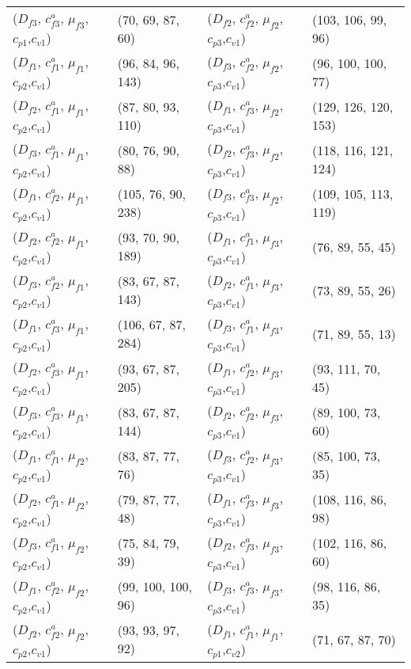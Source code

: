 \documentclass[preprint,12pt]{elsarticle}
\begin{document}
\begin{appendices}
\begin{table}[htbp]
\begin{tabular}{llll}
    ($D_{f3}$, $c^{a}_{f3}$, $\mu_{f3}$, $c_{p1}$,$c_{v1}$) & (70, 69, 87, 60) & ($D_{f2}$, $c^{a}_{f2}$, $\mu_{f2}$, $c_{p3}$,$c_{v1}$) & (103, 106, 99, 96) \\
    ($D_{f1}$, $c^{a}_{f1}$, $\mu_{f1}$, $c_{p2}$,$c_{v1}$) & (96, 84, 96, 143) & ($D_{f3}$, $c^{a}_{f2}$, $\mu_{f2}$, $c_{p3}$,$c_{v1}$) & (96, 100, 100, 77) \\
    ($D_{f2}$, $c^{a}_{f1}$, $\mu_{f1}$, $c_{p2}$,$c_{v1}$) & (87, 80, 93, 110) & ($D_{f1}$, $c^{a}_{f3}$, $\mu_{f2}$, $c_{p3}$,$c_{v1}$) & (129, 126, 120, 153) \\
    ($D_{f3}$, $c^{a}_{f1}$, $\mu_{f1}$, $c_{p2}$,$c_{v1}$) & (80, 76, 90, 88) & ($D_{f2}$, $c^{a}_{f3}$, $\mu_{f2}$, $c_{p3}$,$c_{v1}$) & (118, 116, 121, 124) \\
    ($D_{f1}$, $c^{a}_{f2}$, $\mu_{f1}$, $c_{p2}$,$c_{v1}$) & (105, 76, 90, 238) & ($D_{f3}$, $c^{a}_{f3}$, $\mu_{f2}$, $c_{p3}$,$c_{v1}$) & (109, 105, 113, 119) \\
    ($D_{f2}$, $c^{a}_{f2}$, $\mu_{f1}$, $c_{p2}$,$c_{v1}$) & (93, 70, 90, 189) & ($D_{f1}$, $c^{a}_{f1}$, $\mu_{f3}$, $c_{p3}$,$c_{v1}$) & (76, 89, 55, 45) \\
    ($D_{f3}$, $c^{a}_{f2}$, $\mu_{f1}$, $c_{p2}$,$c_{v1}$) & (83, 67, 87, 143) & ($D_{f2}$, $c^{a}_{f1}$, $\mu_{f3}$, $c_{p3}$,$c_{v1})$ & (73, 89, 55, 26) \\
    ($D_{f1}$, $c^{a}_{f3}$, $\mu_{f1}$, $c_{p2}$,$c_{v1}$) & (106, 67, 87, 284) & ($D_{f3}$, $c^{a}_{f1}$, $\mu_{f3}$, $c_{p3}$,$c_{v1}$) & (71, 89, 55, 13) \\
    ($D_{f2}$, $c^{a}_{f3}$, $\mu_{f1}$, $c_{p2}$,$c_{v1}$) & (93, 67, 87, 205) & ($D_{f1}$, $c^{a}_{f2}$, $\mu_{f3}$, $c_{p3}$,$c_{v1}$) & (93, 111, 70, 45) \\
    ($D_{f3}$, $c^{a}_{f3}$, $\mu_{f1}$, $c_{p2}$,$c_{v1}$) & (83, 67, 87, 144) & ($D_{f2}$, $c^{a}_{f2}$, $\mu_{f3}$, $c_{p3}$,$c_{v1}$) & (89, 100, 73, 60) \\
    ($D_{f1}$, $c^{a}_{f1}$, $\mu_{f2}$, $c_{p2}$,$c_{v1}$) & (83, 87, 77, 76) & ($D_{f3}$, $c^{a}_{f2}$, $\mu_{f3}$, $c_{p3}$,$c_{v1}$) & (85, 100, 73, 35) \\
    ($D_{f2}$, $c^{a}_{f1}$, $\mu_{f2}$, $c_{p2}$,$c_{v1}$) & (79, 87, 77, 48) & ($D_{f1}$, $c^{a}_{f3}$, $\mu_{f3}$, $c_{p3}$,$c_{v1}$) & (108, 116, 86, 98) \\
    ($D_{f3}$, $c^{a}_{f1}$, $\mu_{f2}$, $c_{p2}$,$c_{v1}$) & (75, 84, 79, 39) & ($D_{f2}$, $c^{a}_{f3}$, $\mu_{f3}$, $c_{p3}$,$c_{v1}$) & (102, 116, 86, 60) \\
    ($D_{f1}$, $c^{a}_{f2}$, $\mu_{f2}$, $c_{p2}$,$c_{v1}$) & (99, 100, 100, 96) & ($D_{f3}$, $c^{a}_{f3}$, $\mu_{f3}$, $c_{p3}$,$c_{v1}$) & (98, 116, 86, 35) \\
    ($D_{f2}$, $c^{a}_{f2}$, $\mu_{f2}$, $c_{p2}$,$c_{v1}$) & (93, 93, 97, 92) & ($D_{f1}$, $c^{a}_{f1}$, $\mu_{f1}$, $c_{p1}$,$c_{v2}$) & (71, 67, 87, 70) \\
    \bottomrule
    \end{tabular}%
  \label{tab:oppdetailresults1}%
\end{table}%




\end{appendices}
\end{document}
